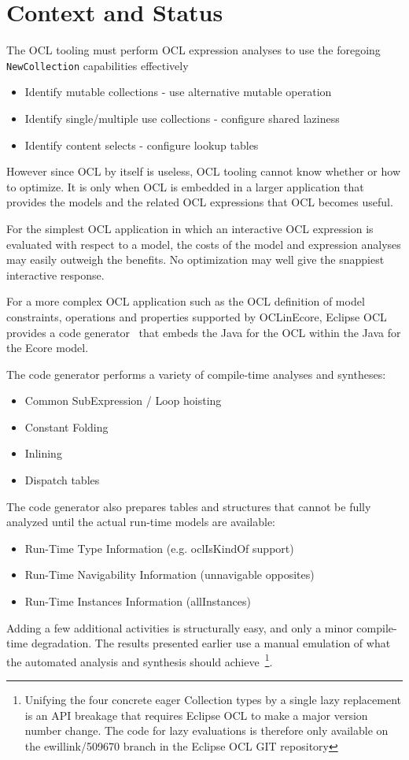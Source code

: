 \documentclass{llncs}
\begin{document}
\section{Context and Status}\label{Context and Status}

The OCL tooling must perform OCL expression analyses to use the foregoing \verb$NewCollection$ capabilities effectively
\begin{itemize}
	\item Identify mutable collections - use alternative mutable operation
	\item Identify single/multiple use collections - configure shared laziness
	\item Identify content selects - configure lookup tables
\end{itemize}

However since OCL by itself is useless, OCL tooling cannot know whether or how to optimize. It is only when OCL is embedded in a larger application that provides the models and the related OCL expressions that OCL becomes useful.

For the simplest OCL application in which an interactive OCL expression is evaluated with respect to a model, the costs of the model and expression analyses may easily outweigh the benefits. No optimization may well give the snappiest interactive response.

For a more complex OCL application such as the OCL definition of model constraints, operations and properties supported by OCLinEcore, Eclipse OCL provides a code generator~\cite{OCL-CG} that embeds the Java for the OCL within the Java for the Ecore model.

The code generator performs a variety of compile-time analyses and syntheses:
\begin{itemize}
	\item Common SubExpression / Loop hoisting
	\item Constant Folding
	\item Inlining
	\item Dispatch tables
\end{itemize}

The code generator also prepares tables and structures that cannot be fully analyzed until
the actual run-time models are available:
\begin{itemize}
	\item Run-Time Type Information (e.g. oclIsKindOf support)
	\item Run-Time Navigability Information (unnavigable opposites)
	\item Run-Time Instances Information (allInstances)
\end{itemize}
Adding a few additional activities is structurally easy, and only a minor compile-time degradation. The results presented earlier use a manual emulation of what the automated analysis and synthesis should achieve~\footnote{Unifying the four concrete eager Collection types by a single lazy replacement is an API breakage that requires Eclipse OCL to make a major version number change. The code for lazy evaluations is therefore only available on the ewillink/509670 branch in the Eclipse OCL GIT repository}.
\end{document}
